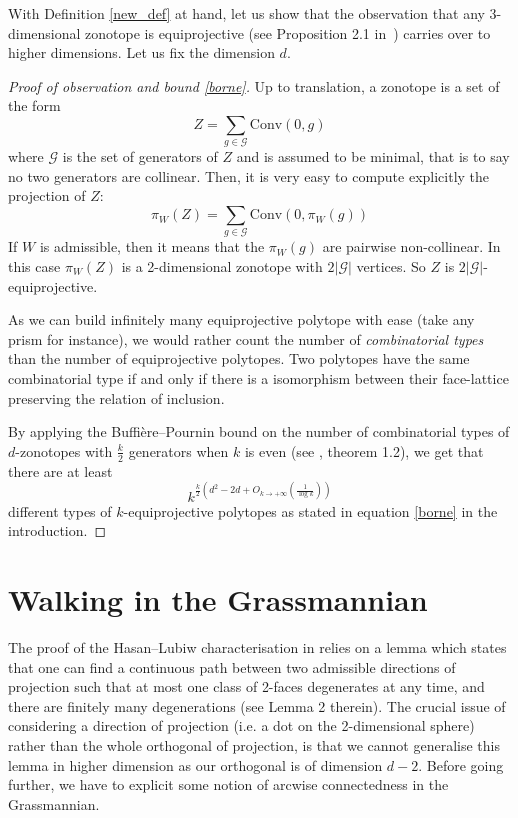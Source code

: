 \documentclass[12pt, notitlepage]{article}
\theoremstyle{plain}
\theoremstyle{definition}
\theoremstyle{plain}
\theoremstyle{remark}
\theoremstyle{plain}
\theoremstyle{plain}
\newcommand{\conv}{\text{Conv}}
\begin{document}
With Definition \ref{new_def} at hand, let us show that the observation that any 3-dimensional zonotope is equiprojective (see Proposition 2.1 in~\cite{TBLP}) carries over to higher dimensions. Let us fix the dimension $d$. 
\begin{proof}[Proof of observation and bound \eqref{borne}]
Up to translation, a zonotope is a set of the form \[Z = \sum_{g\in \mathcal G} \conv(0,g)\] where $\mathcal G$ is the set of generators of $Z$ and is assumed to be minimal, that is to say no two generators are collinear. Then, it is very easy to compute explicitly the projection of $Z$: \[\pi_W(Z) = \sum_{g\in \mathcal G} \conv(0,\pi_W(g))\] If $W$ is admissible, then it means that the $\pi_W(g)$ are pairwise non-collinear. In this case $\pi_W(Z)$ is a 2-dimensional zonotope with $2|\mathcal G|$ vertices. So $Z$ is $2|\mathcal G|$-equiprojective.

As we can build infinitely many equiprojective polytope with ease (take any prism for instance), we would rather count the number of \emph{combinatorial types} than the number of equiprojective polytopes. Two polytopes have the same combinatorial type if and only if there is a isomorphism between their face-lattice preserving the relation of inclusion.

By applying the Buffière--Pournin bound on the number of combinatorial types of $d$-zonotopes with $\frac{k}{2}$ generators when $k$ is even (see \cite{TBLP}, theorem 1.2), we get that there are at least \[ k^{\frac k2\left(d^2-2d + O_{k\to +\infty}\left( \frac{1}{\log k} \right) \right)} \] different types of $k$-equiprojective polytopes as stated in equation \eqref{borne} in the introduction.
\end{proof}

\section{Walking in the Grassmannian}

The proof of the Hasan--Lubiw characterisation in \cite{MHAL} relies on a lemma which states that one can find a continuous path between two admissible directions of projection such that at most one class of 2-faces degenerates at any time, and there are finitely many degenerations (see Lemma 2 therein). The crucial issue of considering a direction of projection (i.e. a dot on the 2-dimensional sphere) rather than the whole orthogonal of projection, is that we cannot generalise this lemma in higher dimension as our orthogonal is of dimension $d-2$. Before going further, we have to explicit some notion of arcwise connectedness in the Grassmannian.
\end{document}
